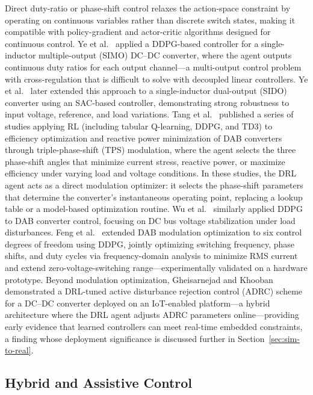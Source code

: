 \documentclass[manuscript,screen,review]{acmart}
\begin{document}
Direct duty-ratio or phase-shift control relaxes the action-space constraint by operating on continuous variables rather than discrete switch states, making it compatible with policy-gradient and actor-critic algorithms designed for continuous control.
Ye et al.~\cite{ye2024deep} applied a DDPG-based controller for a single-inductor multiple-output (SIMO) DC--DC converter, where the agent outputs continuous duty ratios for each output channel---a multi-output control problem with cross-regulation that is difficult to solve with decoupled linear controllers.
Ye et al.~\cite{ye2025soft} later extended this approach to a single-inductor dual-output (SIDO) converter using an SAC-based controller, demonstrating strong robustness to input voltage, reference, and load variations.
Tang et al.~\cite{tang2020reinforcement,tang2021deep,tang2022deep,tang2021artificial} published a series of studies applying RL (including tabular Q-learning, DDPG, and TD3) to efficiency optimization and reactive power minimization of DAB converters through triple-phase-shift (TPS) modulation, where the agent selects the three phase-shift angles that minimize current stress, reactive power, or maximize efficiency under varying load and voltage conditions.
In these studies, the DRL agent acts as a direct modulation optimizer: it selects the phase-shift parameters that determine the converter's instantaneous operating point, replacing a lookup table or a model-based optimization routine.
Wu et al.~\cite{wu2021innovative} similarly applied DDPG to DAB converter control, focusing on DC bus voltage stabilization under load disturbances.
Feng et al.~\cite{feng2025six} extended DAB modulation optimization to six control degrees of freedom using DDPG, jointly optimizing switching frequency, phase shifts, and duty cycles via frequency-domain analysis to minimize RMS current and extend zero-voltage-switching range---experimentally validated on a hardware prototype.
Beyond modulation optimization, Gheisarnejad and Khooban~\cite{gheisarnejad2020iot} demonstrated a DRL-tuned active disturbance rejection control (ADRC) scheme for a DC--DC converter deployed on an IoT-enabled platform---a hybrid architecture where the DRL agent adjusts ADRC parameters online---providing early evidence that learned controllers can meet real-time embedded constraints, a finding whose deployment significance is discussed further in Section~\ref{sec:sim-to-real}.

\subsection{Hybrid and Assistive Control}
\end{document}
